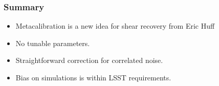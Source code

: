 \documentclass{beamer}
\begin{document}
\frame
{
    \frametitle{Summary}

 
    \begin{itemize}
        \item Metacalibration is a new idea for shear recovery from
            Eric Huff

        \item No tunable parameters.

        \item Straightforward correction for correlated noise.

        \item Bias on simulations is within LSST requirements.
        
    \end{itemize}

}
\end{document}
